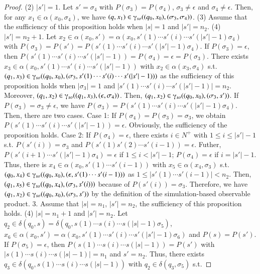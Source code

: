 \documentclass[12pt,draftcls,onecolumn]{IEEEtran}
\begin{document}
\begin{proof}
(2) $|s'|=1$. Let $s'=\sigma_4$ with $P(\sigma_3)=P(\sigma_4)$,
$\sigma_3 \neq \epsilon$ and $\sigma_4 \neq \epsilon$. Then, for
any $ x_1 \in \alpha(x_0, \sigma_4)$, we have $(q, x_1) \in
\gammaup_{so}((q_0, x_0), (\sigma_3, \sigma_4))$. (3) Assume that
the sufficiency of this proposition holds when $|s|=1$ and
$|s'|=n_2$. (4) $|s'|=n_2+1$. Let $x_2 \in \alpha(x_0,
s')=\alpha(x_0, s'(1)\cdots s'(i)\cdots s'(|s'|-1)\sigma_4)$ with
$P(\sigma_3)=P(s')=P(s'(1)\cdots s'(i)\cdots s'(|s'|-1)\sigma_4)$.
If $P(\sigma_3)=\epsilon$, then $P(s'(1)\cdots s'(i)\cdots
s'(|s'|-1))=P(\sigma_4)=\epsilon=P(\sigma_3)$. There exists $x_3
\in \alpha(x_0, s'(1)\cdots s'(i)\cdots s'(|s'|-1))$ with $x_2 \in
\alpha(x_3, \sigma_4)$ s.t. $(q_1, x_3) \in \gammaup_{so}((q_0,
x_0), (\sigma_3, s'(1)\cdots s'(i)\cdots s'(|s'|-1)))$ as the
sufficiency of this proposition holds when $|\sigma_3|=1$ and
$|s'(1)\cdots s'(i)\cdots s'(|s'|-1)|=n_2$. Moreover, $(q_1, x_2)
\in \gammaup_{so}((q_1, x_3), (\epsilon, \sigma_4))$. Then, $(q_1,
x_2) \in \gammaup_{so}((q_0, x_0), (\sigma_3, s'))$. If
$P(\sigma_3)=\sigma_3 \neq \epsilon$, we have
$P(\sigma_3)=P(s'(1)\cdots s'(i)\cdots s'(|s'|-1)\sigma_4)$. Then,
there are two cases. Case 1: If
$P(\sigma_4)=P(\sigma_3)=\sigma_3$, we obtain $P(s'(1)\cdots
s'(i)\cdots s'(|s'|-1))=\epsilon$. Obviously, the sufficiency of
the proposition holds. Case 2: If $P(\sigma_4)=\epsilon$, there
exists $i \in N^{+}$ with $1\leq i \leq |s'|-1$ s.t.
$P(s'(i))=\sigma_3$ and $P(s'(1)s'(2)\cdots s'(i-1))=\epsilon$.
Futher, $P(s'(i+1)\cdots s'(|s'|-1)\sigma_4)=\epsilon$ if $1\leq i
< |s'|-1$; $P(\sigma_4)=\epsilon$ if $i=|s'|-1$. Thus, there is
$x_4 \in \alpha(x_0, s'(1)\cdots s'(i-1))$ with $x_5 \in
\alpha(x_4, \sigma_3)$ s.t. $(q_0, x_4) \in \gammaup_{so}((q_0,
x_0), (\epsilon, s'(1)\cdots s'(i-1)))$ as $1\leq|s'(1)\cdots
s'(i-1)|<n_2$. Then, $(q_1, x_5) \in \gammaup_{so}((q_0, x_4),
(\sigma_3, s'(i)))$ because of $P(s'(i))=\sigma_3$. Therefore, we
have $(q_1, x_2) \in \gammaup_{so}((q_0, x_0), (\sigma_3, s'))$ by
the definition of the simulation-based observable product. 3.
Assume that $|s|=n_1$, $|s'|=n_2$, the sufficiency of this
proposition holds. (4) $|s|=n_1+1$ and $|s'|=n_2$. Let $q_2 \in
\delta(q_0, s)=\delta(q_0, s(1)\cdots s(i)\cdots
s(|s|-1)\sigma_5)$, $x_6 \in \alpha(x_0, s')=\alpha(x_0,
s'(1)\cdots s'(i)\cdots s'(|s'|-1)\sigma_6)$ and $P(s)=P(s')$. If
$P(\sigma_5)=\epsilon$, then $P(s(1)\cdots s(i)\cdots
s(|s|-1))=P(s')$ with $|s(1)\cdots s(i)\cdots s(|s|-1)|=n_1$ and
$s'=n_2$. Thus, there exists $q_3 \in \delta(q_0, s(1)\cdots
s(i)\cdots s(|s|-1))$ with $q_2 \in \delta(q_3, \sigma_5)$ s.t.

\end{proof}
\end{document}
